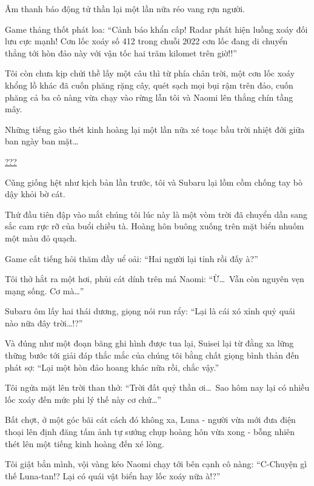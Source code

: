 \documentclass[../main.tex]{subfiles}
\begin{document}
Âm thanh báo động tử thần lại một lần nữa réo vang rợn người.

Game thảng thốt phát loa: ``Cảnh báo khẩn cấp! Radar phát hiện luồng xoáy đối lưu cực mạnh! Cơn lốc xoáy số 412 trong chuỗi 2022 cơn lốc đang di chuyển thẳng tới hòn đảo này với vận tốc hai trăm kilomet trên giờ!!''

Tôi còn chưa kịp chửi thề lấy một câu thì từ phía chân trời, một cơn lốc xoáy khổng lồ khác đã cuốn phăng rặng cây, quét sạch mọi bụi rậm trên đảo, cuốn phăng cả ba cô nàng vừa chạy vào rừng lẫn tôi và Naomi lên thẳng chín tầng mây.

Những tiếng gào thét kinh hoàng lại một lần nữa xé toạc bầu trời nhiệt đới giữa ban ngày ban mặt\dots

\ct

\begin{center}
  \uline{???}
\end{center}

Cũng giống hệt như kịch bản lần trước, tôi và Subaru lại lồm cồm chống tay bò dậy khỏi bờ cát.

Thứ đầu tiên đập vào mắt chúng tôi lúc này là một vòm trời đã chuyển dần sang sắc cam rực rỡ của buổi chiều tà. Hoàng hôn buông xuống trên mặt biển nhuốm một màu đỏ quạch.

Game cất tiếng hỏi thăm đầy uể oải: ``Hai người lại tỉnh rồi đấy à?''

Tôi thở hắt ra một hơi, phủi cát dính trên má Naomi: ``Ừ\dots\ Vẫn còn nguyên vẹn mạng sống. Cơ mà\dots''

Subaru ôm lấy hai thái dương, giọng nói run rẩy: ``Lại là cái xó xỉnh quỷ quái nào nữa đây trời\dots!?''

Và đúng như một đoạn băng ghi hình được tua lại, Suisei lại từ đằng xa lững thững bước tới giải đáp thắc mắc của chúng tôi bằng chất giọng bình thản đến phát sợ: ``Lại một hòn đảo hoang khác nữa rồi, chắc vậy.''


Tôi ngửa mặt lên trời than thở: ``Trời đất quỷ thần ơi\dots\ Sao hôm nay lại có nhiều lốc xoáy đến mức phi lý thế này cơ chứ\dots''

Bất chợt, ở một góc bãi cát cách đó không xa, Luna - người vừa mới đưa điện thoại lên định đăng tấm ảnh tự sướng chụp hoàng hôn vừa xong - bỗng nhiên thét lên một tiếng kinh hoàng đến xé lòng.

Tôi giật bắn mình, vội vàng kéo Naomi chạy tới bên cạnh cô nàng: ``C-Chuyện gì thế Luna-tan!? Lại có quái vật biển hay lốc xoáy nữa à!?''
\end{document}
